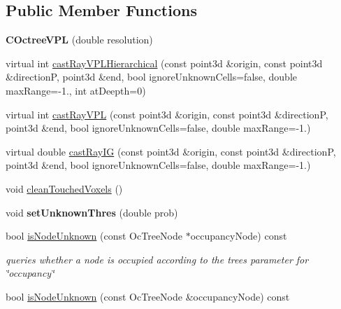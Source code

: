 \subsection*{Public Member Functions}
\begin{DoxyCompactItemize}
\item 
{\bfseries C\+Octree\+V\+PL} (double resolution)\hypertarget{classCOctreeVPL_a0149d4dd0aa97ad6c3bfe2ce5e52ae21}{}\label{classCOctreeVPL_a0149d4dd0aa97ad6c3bfe2ce5e52ae21}

\item 
virtual int \hyperlink{classCOctreeVPL_a8a57fc5e3499b794409ed83919260f99}{cast\+Ray\+V\+P\+L\+Hierarchical} (const point3d \&origin, const point3d \&directionP, point3d \&end, bool ignore\+Unknown\+Cells=false, double max\+Range=-\/1., int at\+Deepth=0)
\item 
virtual int \hyperlink{classCOctreeVPL_adefa863003c11fa51e87e9691bf860fa}{cast\+Ray\+V\+PL} (const point3d \&origin, const point3d \&directionP, point3d \&end, bool ignore\+Unknown\+Cells=false, double max\+Range=-\/1.)
\item 
virtual double \hyperlink{classCOctreeVPL_a3a13d4e2bf90156a0bcc672feb2d521f}{cast\+Ray\+IG} (const point3d \&origin, const point3d \&directionP, point3d \&end, bool ignore\+Unknown\+Cells=false, double max\+Range=-\/1.)
\item 
void \hyperlink{classCOctreeVPL_ac5612fe03561c785f3520b1c9f50177f}{clean\+Touched\+Voxels} ()
\item 
void {\bfseries set\+Unknown\+Thres} (double prob)\hypertarget{classCOctreeVPL_ab12c86b71ae63d2ce5ac9ecedb7bc852}{}\label{classCOctreeVPL_ab12c86b71ae63d2ce5ac9ecedb7bc852}

\item 
bool \hyperlink{classCOctreeVPL_aa708cc6dfe630232cbbf57401c90e37a}{is\+Node\+Unknown} (const Oc\+Tree\+Node $\ast$occupancy\+Node) const \hypertarget{classCOctreeVPL_aa708cc6dfe630232cbbf57401c90e37a}{}\label{classCOctreeVPL_aa708cc6dfe630232cbbf57401c90e37a}

\begin{DoxyCompactList}\small\item\em queries whether a node is occupied according to the tree\textquotesingle{}s parameter for \char`\"{}occupancy\char`\"{} \end{DoxyCompactList}\item 
bool \hyperlink{classCOctreeVPL_aac395e0f6092b287e4bf81c96b6f03ec}{is\+Node\+Unknown} (const Oc\+Tree\+Node \&occupancy\+Node) const \hypertarget{classCOctreeVPL_aac395e0f6092b287e4bf81c96b6f03ec}{}\label{classCOctreeVPL_aac395e0f6092b287e4bf81c96b6f03ec}


\end{DoxyCompactItemize}
